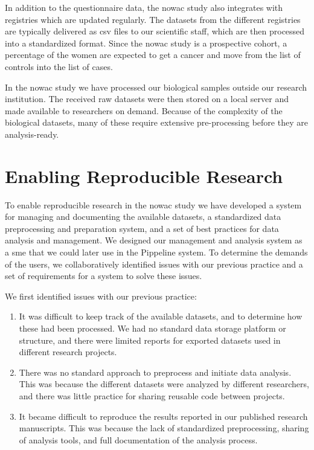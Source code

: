 In addition to the questionnaire data, the \gls{nowac} study also integrates
with registries which are updated regularly. The datasets from the different
registries are typically delivered as \gls{csv} files to our scientific staff,
which are then processed into a standardized format. Since the \gls{nowac} study
is a prospective cohort, a percentage of the women are expected to get a cancer
and move from the list of controls into the list of cases. 

In the \gls{nowac} study we have processed our biological samples outside our
research institution. The received raw datasets were then stored on a
local server and made available to researchers on demand. Because of the
complexity of the biological datasets, many of these require extensive
pre-processing before they are analysis-ready. 


\section{Enabling Reproducible Research} 
To enable reproducible research in the \gls{nowac} study we have developed a
system for managing and documenting the available datasets, a standardized data
preprocessing and preparation system, and a set of best practices for data
analysis and management. We designed our management and analysis system as a
\gls{sme} that we could later use in the Pippeline system. To determine the
demands of the users, we collaboratively identified issues with our previous
practice and a set of requirements for a system to solve these issues.

We first identified issues with our previous practice: 
\begin{enumerate} 
    \item It was difficult to keep track of the available datasets, and to
        determine how these had been processed. We had no standard data storage
        platform or structure, and there were limited reports for exported
        datasets used in different research projects.
        
    \item There was no standard approach to preprocess and initiate data
        analysis. This was because the different datasets were analyzed by
        different researchers, and there was little practice for sharing
        reusable code between projects. 

    \item It became difficult to reproduce the results reported in our published
        research manuscripts. This was because the lack of standardized
        preprocessing, sharing of analysis tools, and full documentation of the
        analysis process. 
        
\end{enumerate} 

